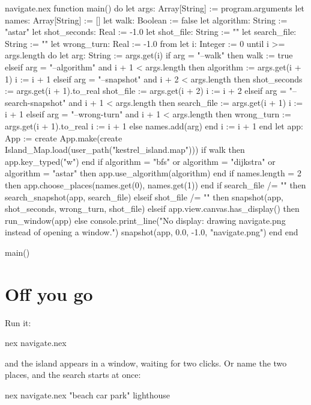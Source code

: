 \begin{continued}{navigate.nex}
function main() do
  let args: Array[String] := program.arguments
  let names: Array[String] := []
  let walk: Boolean := false
  let algorithm: String := "astar"
  let shot_seconds: Real := -1.0
  let shot_file: String := ""
  let search_file: String := ""
  let wrong_turn: Real := -1.0
  from
    let i: Integer := 0
  until
    i >= args.length
  do
    let arg: String := args.get(i)
    if arg = "--walk" then
      walk := true
    elseif arg = "--algorithm" and i + 1 < args.length then
      algorithm := args.get(i + 1)
      i := i + 1
    elseif arg = "--snapshot" and i + 2 < args.length then
      shot_seconds := args.get(i + 1).to_real
      shot_file := args.get(i + 2)
      i := i + 2
    elseif arg = "--search-snapshot" and i + 1 < args.length then
      search_file := args.get(i + 1)
      i := i + 1
    elseif arg = "--wrong-turn" and i + 1 < args.length then
      wrong_turn := args.get(i + 1).to_real
      i := i + 1
    else
      names.add(arg)
    end
    i := i + 1
  end
  let app: App := create App.make(create Island_Map.load(user_path("kestrel_island.map")))
  if walk then
    app.key_typed("w")
  end
  if algorithm = "bfs" or algorithm = "dijkstra" or algorithm = "astar" then
    app.use_algorithm(algorithm)
  end
  if names.length = 2 then
    app.choose_places(names.get(0), names.get(1))
  end
  if search_file /= "" then
    search_snapshot(app, search_file)
  elseif shot_file /= "" then
    snapshot(app, shot_seconds, wrong_turn, shot_file)
  elseif app.view.canvas.has_display() then
    run_window(app)
  else
    console.print_line("No display: drawing navigate.png instead of opening a window.")
    snapshot(app, 0.0, -1.0, "navigate.png")
  end
end

main()
\end{continued}

\section{Off you go}

Run it:

\begin{shell}
nex navigate.nex
\end{shell}

and the island appears in a window, waiting for two clicks. Or name the two
places, and the search starts at once:

\begin{shell}
nex navigate.nex "beach car park" lighthouse
\end{shell}

